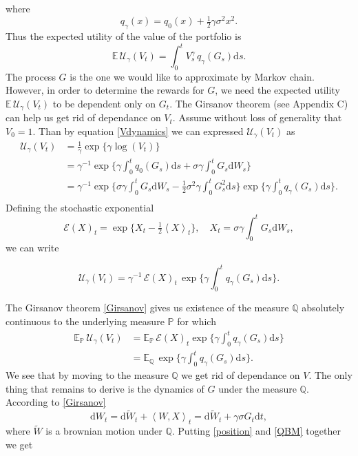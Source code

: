 where
\[q_{\gamma}(x)=q_{0}(x)+\tfrac{1}{2}\gamma\sigma^2 x^2.\]
Thus the expected utility of the value of the portfolio is
\[\mathbb{E}\,\mathcal{U}_{\gamma}(V_t)=\int_0^tV_s^{\gamma}\,q_{\gamma}(G_s)\mathrm{d}s.\]
The process $G$ is the one we would like to approximate by Markov chain. However, in order to determine the rewards for $G$, we need the expected utility  $\mathbb{E}\,\mathcal{U}_{\gamma}(V_t)$ to be dependent only on $G_t$. The Girsanov theorem (see Appendix C) can help us get rid of dependance on $V_t$. Assume without loss of generality that $V_0=1$. Than by equation \eqref{Vdynamics} we can expressed $\mathcal{U}_{\gamma}(V_t)$ as 
\begin{equation*}
\begin{split}
\mathcal{U}_{\gamma}(V_t)&=\tfrac{1}{\gamma}\exp\{\gamma\log(V_t)\}\\
&=\gamma^{-1}\exp\Big\{\gamma\int_0^t q_0(G_s)\mathrm{d}s + \sigma\gamma \int_0^t G_s \mathrm{d}W_s \Big\}\\
&=\gamma^{-1}
\exp\Big\{\sigma\gamma \int_0^t G_s \mathrm{d}W_s -\tfrac{1}{2}\sigma^2\gamma\int_0^t G_s^2\mathrm{d}s\Big\}  \exp\Big\{\gamma\int_0^t q_\gamma(G_s)\mathrm{d}s\Big\}.\\
\end{split}
\end{equation*}
Defining the stochastic exponential
\[\mathcal{E}(X)_t=\exp\{X_t-\tfrac{1}{2}\left\langle X\right\rangle_t\}, \quad X_t=\sigma\gamma\int_0^t G_s \mathrm{d}W_s,\]
we can write 

\begin{equation}
\mathcal{U}_{\gamma}(V_t)=\gamma^{-1}\,\mathcal{E}(X)_t\,\exp\Big\{\gamma\int_0^t q_{\gamma}(G_s)\mathrm{d}s\Big\}.
\end{equation}

The Girsanov theorem \ref{Girsanov} gives us existence of the measure $\mathbb{Q}$ absolutely continuous to the underlying measure $\mathbb{P}$ for which
\begin{equation}
\label{Qreward}
\begin{split}
\mathbb{E}_{\mathbb{P}}\,\mathcal{U}_{\gamma}(V_t)&=\mathbb{E}_{\mathbb{P}}\,\mathcal{E}(X)_t\exp\Big\{\gamma\int_0^t q_{\gamma}(G_s)\mathrm{d}s\Big\}\\
&=\mathbb{E}_{\mathbb{Q}}\,\exp\Big\{\gamma\int_0^t q_{\gamma}(G_s)\mathrm{d}s\Big\}.
\end{split}
\end{equation}
We see that by moving to the measure $\mathbb{Q}$ we get rid of dependance on $V$. The only thing that remains to derive is the dynamics of $G$ under the measure $\mathbb{Q}$. According to \ref{Girsanov}
\begin{equation}
\label{QBM}
\mathrm{d}W_t=\mathrm{d}\widetilde{W}_t+\left\langle W,X \right\rangle_t=\mathrm{d}\widetilde{W}_t+\gamma\sigma G_t\mathrm{d}t,
\end{equation}
where $\widetilde{W}$ is a brownian motion under $\mathbb{Q}$. Putting \eqref{position} and \eqref{QBM} together we get

